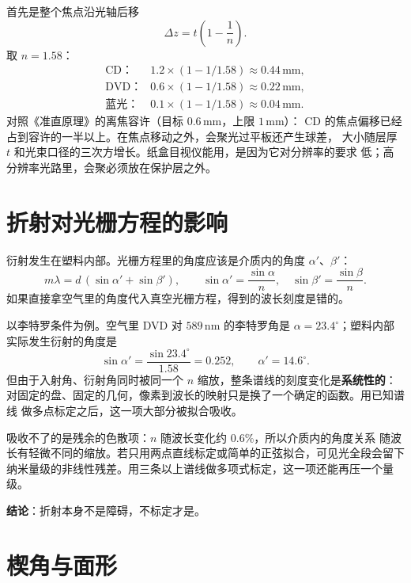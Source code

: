 \documentclass[a4paper,11pt]{ctexart}
\begin{document}
首先是整个焦点沿光轴后移
\begin{equation}
\label{eq:fshift}
\Delta z = t\left(1-\frac{1}{n}\right).
\end{equation}
取 $n=1.58$：
\[
\begin{array}{ll}
\text{CD：} & 1.2\times(1-1/1.58) \approx 0.44\,\mathrm{mm},\\[0.2em]
\text{DVD：} & 0.6\times(1-1/1.58) \approx 0.22\,\mathrm{mm},\\[0.2em]
\text{蓝光：} & 0.1\times(1-1/1.58) \approx 0.04\,\mathrm{mm}.
\end{array}
\]
对照《准直原理》的离焦容许（目标 $0.6\,\mathrm{mm}$，上限 $1\,\mathrm{mm}$）：
CD 的焦点偏移已经占到容许的一半以上。在焦点移动之外，会聚光过平板还产生球差，
大小随层厚 $t$ 和光束口径的三次方增长。纸盒目视仪能用，是因为它对分辨率的要求
低；高分辨率光路里，会聚必须放在保护层之外。

\section{折射对光栅方程的影响}
\label{sec:refraction}

衍射发生在塑料内部。光栅方程里的角度应该是介质内的角度
$\alpha'$、$\beta'$：
\begin{equation}
\label{eq:grating}
m\lambda = d\,(\sin\alpha' + \sin\beta'),\qquad
\sin\alpha' = \frac{\sin\alpha}{n},\quad
\sin\beta' = \frac{\sin\beta}{n}.
\end{equation}
如果直接拿空气里的角度代入真空光栅方程，得到的波长刻度是错的。

以李特罗条件为例。空气里 DVD 对 $589\,\mathrm{nm}$ 的李特罗角是
$\alpha=23.4^\circ$；塑料内部实际发生衍射的角度是
\begin{equation}
\sin\alpha' = \frac{\sin 23.4^\circ}{1.58} = 0.252,
\qquad
\alpha' = 14.6^\circ.
\end{equation}
但由于入射角、衍射角同时被同一个 $n$ 缩放，整条谱线的刻度变化是\textbf{系统性的}：
对固定的盘、固定的几何，像素到波长的映射只是换了一个确定的函数。用已知谱线
做多点标定之后，这一项大部分被拟合吸收。

吸收不了的是残余的色散项：$n$ 随波长变化约 $0.6\%$，所以介质内的角度关系
随波长有轻微不同的缩放。若只用两点直线标定或简单的正弦拟合，可见光全段会留下
纳米量级的非线性残差。用三条以上谱线做多项式标定，这一项还能再压一个量级。

\textbf{结论}：折射本身不是障碍，不标定才是。

\section{楔角与面形}
\label{sec:wedge}
\end{document}
